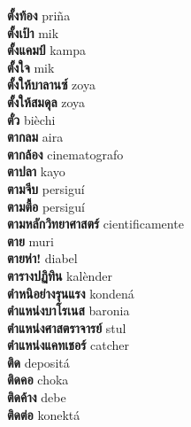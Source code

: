 \textbf{ ตั้งท้อง  } priña \\
\textbf{ ตั้งเป้า  } mik \\
\textbf{ ตั้งแคมป์  } kampa \\
\textbf{ ตั้งใจ  } mik \\
\textbf{ ตั้งให้บาลานซ์  } zoya \\
\textbf{ ตั้งให้สมดุล  } zoya \\
\textbf{ ตั๋ว  } bièchi \\
\textbf{ ตากลม  } aira \\
\textbf{ ตากล้อง  } cinematografo \\
\textbf{ ตาปลา  } kayo \\
\textbf{ ตามจีบ  } persiguí \\
\textbf{ ตามตื้อ  } persiguí \\
\textbf{ ตามหลักวิทยาศาสตร์  } cientificamente \\
\textbf{ ตาย  } muri \\
\textbf{ ตายห่า!  } diabel \\
\textbf{ ตารางปฏิทิน  } kalènder \\
\textbf{ ตำหนิอย่างรุนแรง  } kondená \\
\textbf{ ตำแหน่งบาโรเนส  } baronia \\
\textbf{ ตำแหน่งศาสตราจารย์  } stul \\
\textbf{ ตำแหน่งแคทเชอร์  } catcher \\
\textbf{ ติด  } depositá \\
\textbf{ ติดคอ  } choka \\
\textbf{ ติดค้าง  } debe \\
\textbf{ ติดต่อ  } konektá \\
